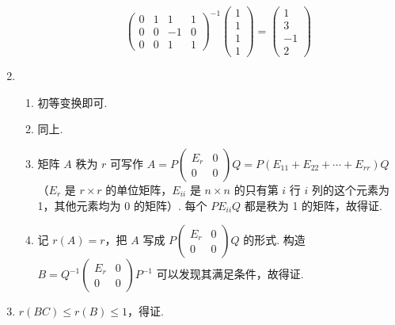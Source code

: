 \begin{enumerate}
\begin{enumerate}
\[\begin{pmatrix}
                            0 & 1 & 1  & 1 \\
                            0 & 0 & -1 & 0 \\
                            0 & 0 & 1  & 1
                        \end{pmatrix}^{-1} \begin{pmatrix} 1 \\ 1 \\ 1 \\ 1 \end{pmatrix} = \begin{pmatrix} 1 \\ 3 \\ -1 \\ 2 \end{pmatrix} \]
          \end{enumerate}

    \item \begin{enumerate}
              \item 初等变换即可.

              \item 同上.

              \item 矩阵 $A$ 秩为 $r$ 可写作 $A=P\begin{pmatrix}E_r & 0 \\ 0 & 0\end{pmatrix}Q = P(E_{11}+E_{22}+\cdots+E_{rr})Q$（$E_r$ 是 $r\times r$ 的单位矩阵，$E_{ii}$ 是 $n\times n$ 的只有第 $i$ 行 $i$ 列的这个元素为 1，其他元素均为 0 的矩阵）. 每个 $PE_{ii}Q$ 都是秩为 1 的矩阵，故得证.

              \item 记 $r(A)=r$，把 $A$ 写成 $P\begin{pmatrix}E_r & 0 \\ 0 & 0\end{pmatrix}Q$ 的形式. 构造 $B=Q^{-1}\begin{pmatrix}E_r & 0 \\ 0 & 0\end{pmatrix}P^{-1}$ 可以发现其满足条件，故得证.
          \end{enumerate}

    \item $r(BC)\leqslant r(B) \leqslant 1$，得证.


\end{enumerate}
